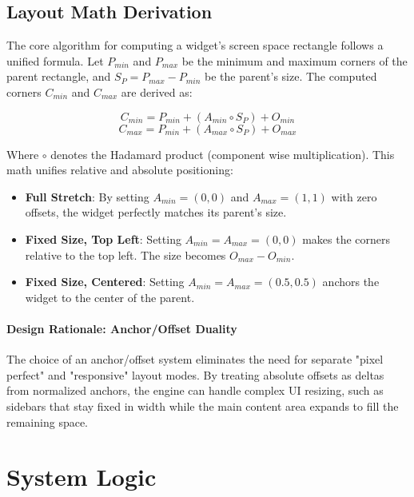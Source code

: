 \subsection{Layout Math Derivation}

The core algorithm for computing a widget's screen space rectangle follows a unified formula. Let $P_{min}$ and $P_{max}$ be the minimum and maximum corners of the parent rectangle, and $S_P = P_{max} - P_{min}$ be the parent's size. The computed corners $C_{min}$ and $C_{max}$ are derived as:

\begin{equation}
C_{min} = P_{min} + (A_{min} \circ S_P) + O_{min}
\end{equation}
\begin{equation}
C_{max} = P_{min} + (A_{max} \circ S_P) + O_{max}
\end{equation}

Where $\circ$ denotes the Hadamard product (component wise multiplication). This math unifies relative and absolute positioning:

\begin{itemize}
    \item \textbf{Full Stretch}: By setting $A_{min} = (0,0)$ and $A_{max} = (1,1)$ with zero offsets, the widget perfectly matches its parent's size.
    \item \textbf{Fixed Size, Top Left}: Setting $A_{min} = A_{max} = (0,0)$ makes the corners relative to the top left. The size becomes $O_{max} - O_{min}$.
    \item \textbf{Fixed Size, Centered}: Setting $A_{min} = A_{max} = (0.5, 0.5)$ anchors the widget to the center of the parent.
\end{itemize}


\paragraph{Design Rationale: Anchor/Offset Duality}

The choice of an anchor/offset system eliminates the need for separate "pixel perfect" and "responsive" layout modes. By treating absolute offsets as deltas from normalized anchors, the engine can handle complex UI resizing, such as sidebars that stay fixed in width while the main content area expands to fill the remaining space.



\section{System Logic}

